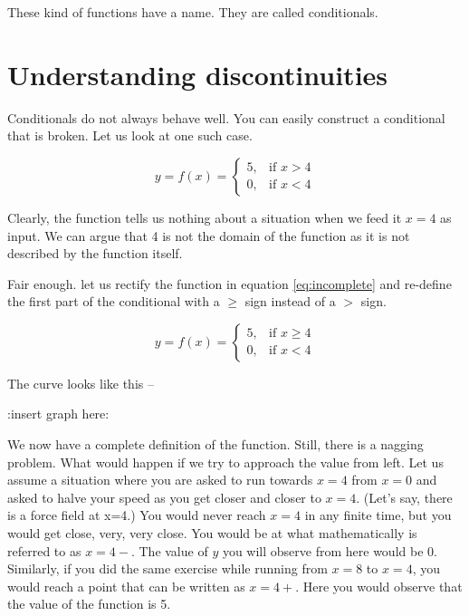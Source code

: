 These kind of functions have a name. They are called conditionals.

\section{Understanding discontinuities}

Conditionals do not always behave well. You can easily construct a conditional that is broken. Let us look at one such case.

\begin{equation}
    y = f(x)=
\begin{cases}
    5 ,& \text{if } x > 4\\
    0, & \text{if } x < 4
\end{cases}
\label{eq:incomplete}
\end{equation}

Clearly, the function tells us nothing about a situation when we feed it $x=4$ as input. We can argue that 4 is not the domain of the function as it is not described by the function itself.

Fair enough. let us rectify the function in equation \eqref{eq:incomplete} and re-define the first part of the conditional with a $\geq$ sign instead of a $>$ sign.

\begin{equation}
    y = f(x)=
\begin{cases}
    5 ,& \text{if } x \geq 4\\
    0, & \text{if } x < 4
\end{cases}
\label{eq:complete}
\end{equation}

The curve looks like this --

:insert graph here:

We now have a complete definition of the function. Still, there is a nagging problem. What would happen if we try to approach the value from left. Let us assume a situation where you are asked to run towards $x=4$ from $x=0$ and asked to halve your speed as you get closer and closer to $x=4$. (Let's say, there is a force field at x=4.) You would never reach $x=4$ in any finite time, but you would get close, very, very close. You would be at what mathematically is referred to as $x=4-$. The value of $y$ you will observe from here would be 0. Similarly, if you did the same exercise while running from $x=8$ to $x=4$, you would reach a point that can be written as $x=4+$. Here you would observe that the value of the function is 5.

